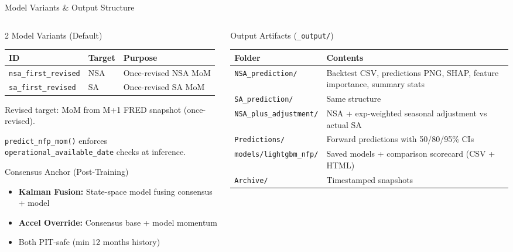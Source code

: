 \documentclass[aspectratio=169,10pt]{beamer}
\begin{document}
\begin{frame}{Model Variants \& Output Structure}
\begin{columns}[T]
\begin{column}{0.48\textwidth}
\begin{block}{2 Model Variants (Default)}
\footnotesize
\begin{tabular}{@{}llp{3cm}@{}}
\toprule
\textbf{ID} & \textbf{Target} & \textbf{Purpose} \\
\midrule
\texttt{nsa\_first\_revised} & NSA & Once-revised NSA MoM \\
\texttt{sa\_first\_revised} & SA & Once-revised SA MoM \\
\bottomrule
\end{tabular}

\vspace{0.1cm}
Revised target: MoM from M+1 FRED snapshot (once-revised).

\vspace{0.1cm}
\texttt{predict\_nfp\_mom()} enforces \texttt{operational\_available\_date} checks at inference.
\end{block}

\begin{block}{Consensus Anchor (Post-Training)}
\footnotesize
\begin{itemize}
  \item \textbf{Kalman Fusion:} State-space model fusing consensus + model
  \item \textbf{Accel Override:} Consensus base + model momentum
  \item Both PIT-safe (min 12 months history)
\end{itemize}
\end{block}
\end{column}
\begin{column}{0.48\textwidth}
\begin{block}{Output Artifacts (\texttt{\_output/})}
\scriptsize
\begin{tabular}{@{}lp{4.3cm}@{}}
\toprule
\textbf{Folder} & \textbf{Contents} \\
\midrule
\texttt{NSA\_prediction/} & Backtest CSV, predictions PNG, SHAP, feature importance, summary stats \\
\texttt{SA\_prediction/} & Same structure \\
\texttt{NSA\_plus\_adjustment/} & NSA + exp-weighted seasonal adjustment vs actual SA \\
\texttt{Predictions/} & Forward predictions with 50/80/95\% CIs \\
\texttt{models/lightgbm\_nfp/} & Saved models + comparison scorecard (CSV + HTML) \\
\texttt{Archive/} & Timestamped snapshots \\
\bottomrule
\end{tabular}
\end{block}
\end{column}
\end{columns}
\end{frame}
\end{document}
